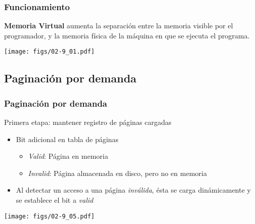 \documentclass[letter]{beamer}
\begin{document}
\begin{frame}
  \frametitle{Funcionamiento}

  {\bf Memoria Virtual} aumenta la separación entre la memoria visible por el programador,
  y la memoria física de la máquina en que se ejecuta el programa.
  
  \begin{center}
    \texttt{[image: figs/02-9\_01.pdf]}
  \end{center}


\end{frame}
%
%  
%
\subsection{Paginación por demanda}

\begin{frame}
  \frametitle{Paginación por demanda}

  Primera etapa: mantener registro de páginas cargadas
  \begin{itemize}
    \item Bit adicional en tabla de páginas
      \begin{itemize}
        \item {\em Valid}: Página en memoria
        \item {\em Invalid}: Página almacenada en disco, pero no en memoria
      \end{itemize}
    \item Al detectar un acceso a una página {\em inválida}, ésta se carga dinámicamente
          y se establece el bit a {\em valid}
  \end{itemize}

  \begin{center}
    \texttt{[image: figs/02-9\_05.pdf]}
  \end{center}
  
\end{frame}
\end{document}
